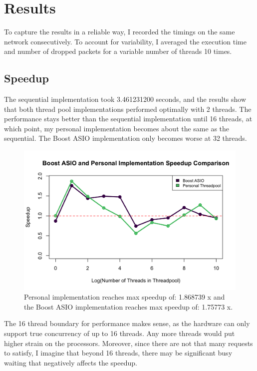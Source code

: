 \documentclass[12pt]{article}
\begin{document}
\section{Results}

To capture the results in a reliable way, I recorded the timings on the same network consecutively. To account for variability, I averaged the execution time and number of dropped packets for a variable number of threads 10 times. 

\subsection{Speedup}
    The sequential implementation took 3.461231200 seconds, and the results show that both thread pool implementations performed optimally with 2 threads. The performance stays better than the sequential implementation until 16 threads, at which point, my personal implementation becomes about the same as the sequential. The Boost ASIO implementation only becomes worse at 32 threads. 

    \begin{figure}[H]
        \centering
        \includegraphics[width = 1.0\linewidth]{speedupComp.png}
        \caption{Personal implementation reaches max speedup of: 1.868739 x and the Boost ASIO implementation reaches max speedup of: 1.75773 x.}
    \end{figure}

    The 16 thread boundary for performance makes sense, as the hardware can only support true concurrency of up to 16 threads. Any more threads would put higher strain on the processors. Moreover, since there are not that many requests to satisfy, I imagine that beyond 16 threads, there may be significant busy waiting that negatively affects the speedup. 
\end{document}
